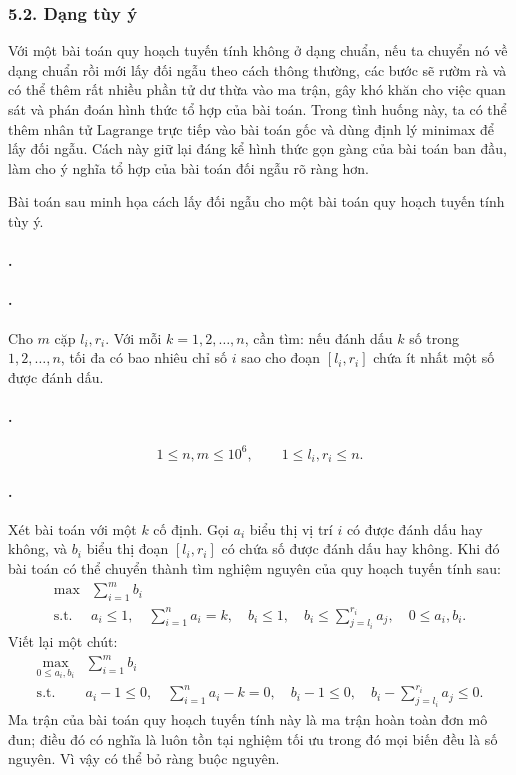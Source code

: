 \documentclass[11pt]{article}
\begin{document}
\subsubsection*{5.2. Dạng tùy ý}

Với một bài toán quy hoạch tuyến tính không ở dạng chuẩn, nếu ta chuyển nó về
dạng chuẩn rồi mới lấy đối ngẫu theo cách thông thường, các bước sẽ rườm rà và
có thể thêm rất nhiều phần tử dư thừa vào ma trận, gây khó khăn cho việc quan
sát và phán đoán hình thức tổ hợp của bài toán. Trong tình huống này, ta có
thể thêm nhân tử Lagrange trực tiếp vào bài toán gốc và dùng định lý minimax để
lấy đối ngẫu. Cách này giữ lại đáng kể hình thức gọn gàng của bài toán ban đầu,
làm cho ý nghĩa tổ hợp của bài toán đối ngẫu rõ ràng hơn.

Bài toán sau minh họa cách lấy đối ngẫu cho một bài toán quy hoạch tuyến tính
tùy ý.

\paragraph{.}
\paragraph{.}
Cho \(m\) cặp \(l_i,r_i\). Với mỗi \(k=1,2,\ldots,n\), cần tìm: nếu đánh dấu
\(k\) số trong \(1,2,\ldots,n\), tối đa có bao nhiêu chỉ số \(i\) sao cho đoạn
\([l_i,r_i]\) chứa ít nhất một số được đánh dấu.

\paragraph{.}
\[
  1\le n,m\le 10^6,\qquad 1\le l_i,r_i\le n.
\]

\paragraph{.}
Xét bài toán với một \(k\) cố định. Gọi \(a_i\) biểu thị vị trí \(i\) có được
đánh dấu hay không, và \(b_i\) biểu thị đoạn \([l_i,r_i]\) có chứa số được đánh
dấu hay không. Khi đó bài toán có thể chuyển thành tìm nghiệm nguyên của quy
hoạch tuyến tính sau:
\[
\begin{array}{ll}
  \max & \displaystyle\sum_{i=1}^{m} b_i\\
  \text{s.t.} &
  a_i\le 1,\quad \displaystyle\sum_{i=1}^{n}a_i=k,\quad
  b_i\le 1,\quad b_i\le \displaystyle\sum_{j=l_i}^{r_i}a_j,\quad
  0\le a_i,b_i.
\end{array}
\]
Viết lại một chút:
\[
\begin{array}{ll}
  \max\limits_{0\le a_i,b_i} & \displaystyle\sum_{i=1}^{m} b_i\\
  \text{s.t.} &
  a_i-1\le 0,\quad \displaystyle\sum_{i=1}^{n}a_i-k=0,\quad
  b_i-1\le 0,\quad b_i-\displaystyle\sum_{j=l_i}^{r_i}a_j\le 0.
\end{array}
\]
Ma trận của bài toán quy hoạch tuyến tính này là ma trận hoàn toàn đơn mô đun;
điều đó có nghĩa là luôn tồn tại nghiệm tối ưu trong đó mọi biến đều là số
nguyên. Vì vậy có thể bỏ ràng buộc nguyên.
\end{document}
